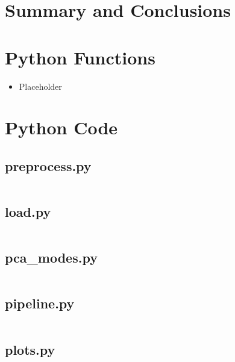 \documentclass{article}
\begin{document}
\section{Summary and Conclusions}

\FloatBarrier
\printbibliography

\begin{appendices}
    \section{Python Functions}
        \label{sec:functions}
        \begin{itemize}
            \item Placeholder
        \end{itemize}
    \section{Python Code}
        \label{sec:code}
    \subsection{preprocess.py}
        \label{subsec:preprocess}
        \inputminted{python}{preprocess.py}
    \subsection{load.py}
        \label{subsec:load}
        \inputminted{python}{load.py}
    \subsection{pca\_modes.py}
        \label{subsec:pca_modes}
        \inputminted{python}{pca_modes.py}
    \subsection{pipeline.py}
        \label{subsec:pipeline}
        \inputminted{python}{pipeline.py}
    \subsection{plots.py}
        \label{subsec:plots}
        \inputminted{python}{plots.py}

\end{appendices}
\end{document}
